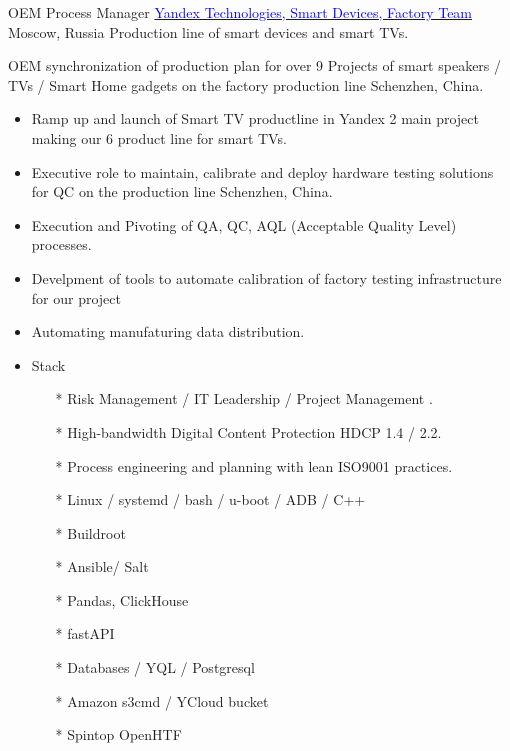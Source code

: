         { OEM Process Manager }
        {\href{https://www.yandex.com/alice}{\textcolor{blue}{Yandex Technologies, Smart Devices, Factory Team}}}
        {Moscow, Russia}
        {
        \newline
        Production line of smart devices and smart TVs.
        }
        {  OEM synchronization of production plan for over 9 Projects of smart speakers / TVs / Smart Home gadgets on the factory production line Schenzhen, China.
            \begin{itemize}
                \item Ramp up and launch of Smart TV productline in Yandex 2 main project making our 6 product line for smart TVs.
                \item Executive role to maintain, calibrate and deploy hardware testing solutions for QC on the production line Schenzhen, China.
                \item Execution and Pivoting of QA, QC, AQL (Acceptable Quality Level) processes.
                \item Develpment of tools to automate calibration of factory testing infrastructure for our project
                \item Automating manufaturing data distribution.
                \item Stack
                    \begin{itemize}
                        \item[*] Risk Management / IT Leadership / Project Management .
                        \item[*] High-bandwidth Digital Content Protection HDCP 1.4 / 2.2.
                        \item[*] Process engineering and planning with lean ISO9001 practices.
                        \item[*] Linux / systemd / bash / u-boot / ADB / C++ 
                        \item[*] Buildroot
                        \item[*] Ansible/ Salt
                        \item[*] Pandas, ClickHouse
                        \item[*] fastAPI
                        \item[*] Databases / YQL / Postgresql
                        \item[*] Amazon s3cmd / YCloud bucket
                        \item[*] Spintop OpenHTF
                    \end{itemize}
                \end{itemize}
        }
        

